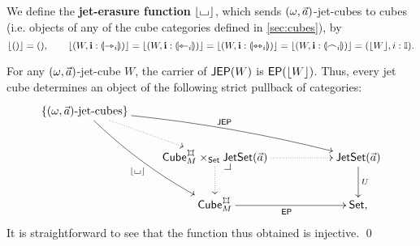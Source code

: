 \documentclass[a4paper]{memoir}
\begin{document}
\begin{definition} \label{def:jet-cube-erasure}
	We define the \textbf{jet-erasure function} $\mathopen{}\left\lfloor {\llcorner\hspace{-.4ex}\lrcorner} \right\rfloor\mathclose{}$, which sends $(\omega, \vec a)$-jet-cubes to cubes (i.e. objects of any of the cube categories defined in \cref{sec:cubes}), by
	\[
		\mathopen{}\left\lfloor () \right\rfloor\mathclose{} = (),
		\qquad
		\mathopen{}\left\lfloor (W, \mathbf{i} : {\llparenthesis \rightarrowtriangle_i \rrparenthesis}) \right\rfloor\mathclose{} =
		\mathopen{}\left\lfloor (W, \mathbf{i} : {\llparenthesis \leftarrowtriangle_i \rrparenthesis}) \right\rfloor\mathclose{} =
		\mathopen{}\left\lfloor (W, \mathbf{i} : {\llparenthesis \leftrightarrowtriangle_i \rrparenthesis}) \right\rfloor\mathclose{} =
		\mathopen{}\left\lfloor (W, \mathbf{i} : {\llparenthesis \frown_i \rrparenthesis}) \right\rfloor\mathclose{} =
		(\mathopen{}\left\lfloor W \right\rfloor\mathclose{}, i : {\mathbb I}).
	\]
\end{definition}
\begin{corollary} \label{thm:jet-cube-pullback}
	For any $(\omega, \vec a)$-jet-cube $W$, the carrier of $\mathsf{JEP}(W)$ is $\mathsf{EP}(\mathopen{}\left\lfloor W \right\rfloor\mathclose{})$.
	Thus, every jet cube determines an object of the following strict pullback of categories:
	\[
			\xymatrix{
				\accol{\text{$(\myorix, \vec a)$-jet-cubes}}
					\ar@/^/[rrrd]^{\JEP}
					\ar@/_/[rdd]_{\erasejc{\loch}}
					\ar@{.>}[rd]
				\\
				&
				\cubecat^\mycubex_M \times_\Set \jetset{\vec a}
					\ar@{.>}[rr]
					\ar@{.>}[d]
					\xydrcorner
				&&
				\jetset{\vec a}
					\ar[d]^U
				\\
				&
				\cubecat^\mycubex_M
					\ar[rr]_{\EP}
				&&
				\Set,
			}
	\]
	It is straightforward to see that the function thus obtained is injective. \qed
\end{corollary}
\end{document}
